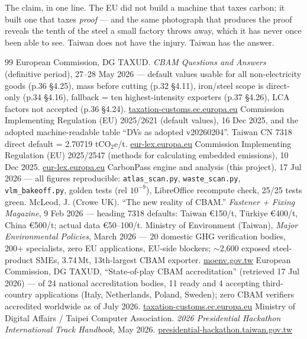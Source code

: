 \documentclass[11pt,a4paper]{article}
\begin{document}
\begin{spotlight}{The claim, in one line.}
The EU did not build a machine that taxes carbon; it built one that taxes \emph{proof} --- and the same photograph that produces the proof reveals the tenth of the steel a small factory throws away, which it has never once been able to see. Taiwan does not have the injury. Taiwan has the answer.
\end{spotlight}

\clearpage
{}
\footnotesize
\begin{thebibliography}{99}\setlength{\itemsep}{2.2pt}
 European Commission, DG TAXUD. \emph{CBAM Questions and Answers} (definitive period), 27--28 May 2026 --- default values usable for all non-electricity goods (p.36 \S4.25), mass before cutting (p.32 \S4.11), iron/steel scope is direct-only (p.34 \S4.16), fallback = ten highest-intensity exporters (p.37 \S4.26), LCA factors not accepted (p.36 \S4.24). \href{https://taxation-customs.ec.europa.eu/carbon-border-adjustment-mechanism/cbam-communication-and-faqs_en}{taxation-customs.ec.europa.eu}
 Commission Implementing Regulation (EU) 2025/2621 (default values), 16 Dec 2025, and the adopted machine-readable table ``DVs as adopted v20260204''. Taiwan CN 7318 direct default = 2.70719 tCO$_2$e/t. \href{https://eur-lex.europa.eu/legal-content/EN/TXT/?uri=OJ:L_202502621}{eur-lex.europa.eu}
 Commission Implementing Regulation (EU) 2025/2547 (methods for calculating embedded emissions), 10 Dec 2025. \href{https://eur-lex.europa.eu/legal-content/EN/TXT/?uri=OJ:L_202502547}{eur-lex.europa.eu}
 CarbonPass engine and analysis (this project), 17 Jul 2026 --- all figures reproducible: \texttt{atlas\_scan.py}, \texttt{waste\_scan.py}, \texttt{vlm\_bakeoff.py}, golden tests (rel $10^{-9}$), LibreOffice recompute check, 25/25 tests green.
 McLeod, J. (Crowe UK). ``The new reality of CBAM.'' \emph{Fastener + Fixing Magazine}, 9 Feb 2026 --- heading 7318 defaults: Taiwan €150/t, T\"urkiye €400/t, China €500/t; actual data €50--100/t.
 Ministry of Environment (Taiwan), \emph{Major Environmental Policies}, March 2026 --- 20 domestic GHG verification bodies, 200+ specialists, zero EU applications, EU-side blockers; $\sim$2,600 exposed steel-product SMEs, 3.74\,Mt, 13th-largest CBAM exporter. \href{https://www.moenv.gov.tw/en/}{moenv.gov.tw}
 European Commission, DG TAXUD, ``State-of-play CBAM accreditation'' (retrieved 17 Jul 2026) --- of 24 national accreditation bodies, 11 ready and 4 accepting third-country applications (Italy, Netherlands, Poland, Sweden); zero CBAM verifiers accredited worldwide as of July 2026. \href{https://taxation-customs.ec.europa.eu/carbon-border-adjustment-mechanism/cbam-verification_en}{taxation-customs.ec.europa.eu}
 Ministry of Digital Affairs / Taipei Computer Association. \emph{2026 Presidential Hackathon International Track Handbook}, May 2026. \href{https://presidential-hackathon.taiwan.gov.tw/en/international-track/}{presidential-hackathon.taiwan.gov.tw}
\end{thebibliography}
\end{document}

